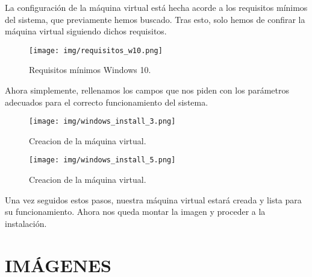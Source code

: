 \documentclass[12pt]{article}
\begin{document}
      La configuración de la máquina virtual está hecha acorde a los requisitos mínimos del sistema, que previamente hemos 
      buscado. Tras esto, solo hemos de confirar la máquina virtual siguiendo dichos requisitos.

      \begin{figure}[h]
        \centering
        \texttt{[image: img/requisitos\_w10.png]}
        \caption{Requisitos mínimos Windows 10.}
        \label{requisitos}
      \end{figure}

      \newpage

      Ahora simplemente, rellenamos los campos que nos piden con los parámetros adecuados para el correcto 
      funcionamiento del sistema.

      \begin{figure}[h]
        \centering
        \texttt{[image: img/windows\_install\_3.png]}
        \caption{Creacion de la máquina virtual.}
        \label{Windows2}
      \end{figure}

      \begin{figure}[h]
        \centering
        \texttt{[image: img/windows\_install\_5.png]}
        \caption{Creacion de la máquina virtual.}
        \label{Windows3}
      \end{figure}
    
      Una vez seguidos estos pasos, nuestra máquina virtual estará creada y lista para su funcionamiento. Ahora 
      nos queda montar la imagen y proceder a la instalación.
    
    
    
    
    
    
    
    
    
    
    \newpage

    \section{IMÁGENES}
    \listoffigures
      
\end{document}
